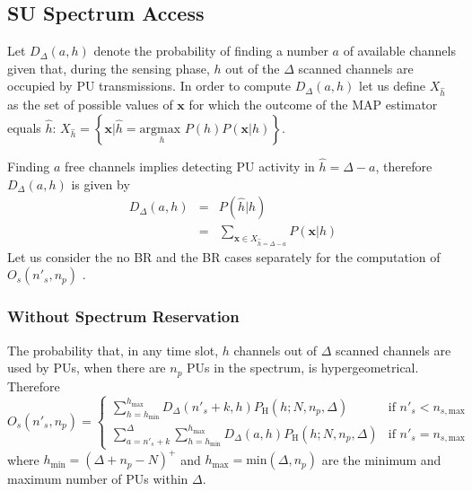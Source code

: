 \subsection{SU Spectrum Access}
Let $D_{\Delta}\left(a,h\right)$ denote the probability of finding a number $a$ of available channels given that, during the sensing phase, $h$ out of the $\Delta$ scanned channels are occupied by PU transmissions. 
In order to compute $D_{\Delta}\left(a,h\right)$ let us define $X_{\hat{h}}$ as the set of possible values of $\mathbf{x}$ for which the outcome of the MAP estimator equals $\hat{h}$: $X_{\hat{h}} = \left\{\mathbf{x}|\hat{h} = \underset{h}{\text{argmax }} P\left(h\right)P\left(\mathbf{x}|h\right)\right\}$.

Finding $a$ free channels implies detecting PU activity in $\hat{h}=\Delta-a$, therefore
 $D_{\Delta}\left(a,h\right)$ is given by
\begin{equation}
\begin{array}{lcl}
D_{\Delta}\left(a,h\right) & = & P(\hat{h}|h)\\
& = & \sum_{\mathbf{x}\in X_{\hat{h}=\Delta-a}}P\left(\mathbf{x}|h\right)
\end{array}
\end{equation}  
Let us consider the no BR and the BR cases separately for the computation of $O_{s}\left(n'_{s},n_{p}\right)$ .
\subsubsection{Without Spectrum Reservation}
The probability that, in any time slot, $h$ channels out of $\Delta$ scanned channels are used by PUs, when there are $n_{p}$ PUs in the spectrum, is hypergeometrical. Therefore
\begin{equation}\label{Os1}
O_{s}\left(n'_{s},n_{p}\right) = 
\begin{cases} \displaystyle\sum_{h=h_{\text{min}}}^{h_{\text{max}}}D_{\Delta}\left(n'_{s}+k,h\right)P_{\text{H}}\left(h;N,n_{p},\Delta\right)&\mbox{if } n'_{s}<n_{s,\text{max}}\\
\displaystyle\sum_{a=n'_{s}+k}^{\Delta}\displaystyle\sum_{h=h_{\text{min}}}^{h_{\text{max}}}D_{\Delta}\left(a,h\right)P_{\text{H}}\left(h;N,n_{p},\Delta\right)&\mbox{if } n'_{s}=n_{s,\text{max}}
\end{cases}
\end{equation} 
where $h_{\text{min}} = \left(\Delta+n_{p}-N\right)^{+}$ and $h_{\text{max}} = \mbox{min}\left(\Delta,n_{p}\right)$ are the minimum and maximum number of PUs within $\Delta$.
